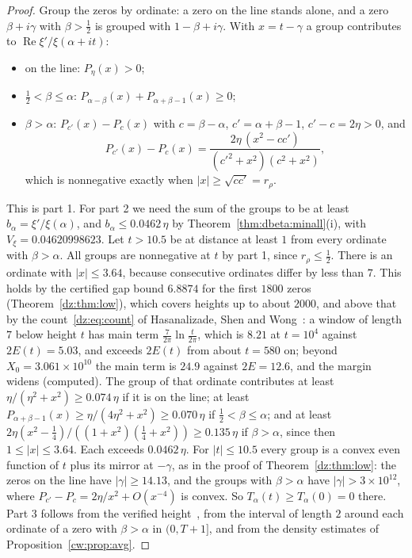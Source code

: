 \begin{proof}
Group the zeros by ordinate: a zero on the line stands alone, and a zero $\beta+i\gamma$ with $\beta>\frac12$ is grouped with $1-\beta+i\gamma$. With $x=t-\gamma$ a group contributes to $\operatorname{Re}\xi'/\xi(\alpha+it)$:
\begin{itemize}
\item on the line: $P_\eta(x)>0$;
\item $\frac12<\beta\le\alpha$: $P_{\alpha-\beta}(x)+P_{\alpha+\beta-1}(x)\ge0$;
\item $\beta>\alpha$: $P_{c'}(x)-P_c(x)$ with $c=\beta-\alpha$, $c'=\alpha+\beta-1$, $c'-c=2\eta>0$, and
\[
P_{c'}(x)-P_c(x)=\frac{2\eta\,(x^2-cc')}{(c'^2+x^2)(c^2+x^2)},
\]
which is nonnegative exactly when $|x|\ge\sqrt{cc'}=r_\rho$.
\end{itemize}
This is part 1. For part 2 we need the sum of the groups to be at least $b_\alpha=\xi'/\xi(\alpha)$, and $b_\alpha\le0.0462\,\eta$ by Theorem~\ref{thm:dbeta:minall}(i), with $V_\xi=0.04620998623$. Let $t>10.5$ be at distance at least $1$ from every ordinate with $\beta>\alpha$. All groups are nonnegative at $t$ by part 1, since $r_\rho\le\frac12$. There is an ordinate with $|x|\le3.64$, because consecutive ordinates differ by less than $7$. This holds by the certified gap bound $6.8874$ for the first $1800$ zeros (Theorem~\ref{dz:thm:low}), which covers heights up to about $2000$, and above that by the count~\eqref{dz:eq:count} of Hasanalizade, Shen and Wong~\cite{HSW22}: a window of length $7$ below height $t$ has main term $\frac7{2\pi}\ln\frac t{2\pi}$, which is $8.21$ at $t=10^4$ against $2E(t)=5.03$, and exceeds $2E(t)$ from about $t=580$ on; beyond $X_0=3.061\times10^{10}$ the main term is $24.9$ against $2E=12.6$, and the margin widens (computed). The group of that ordinate contributes at least $\eta/(\eta^2+x^2)\ge0.074\,\eta$ if it is on the line; at least $P_{\alpha+\beta-1}(x)\ge\eta/(4\eta^2+x^2)\ge0.070\,\eta$ if $\frac12<\beta\le\alpha$; and at least $2\eta(x^2-\frac14)/((1+x^2)(\frac14+x^2))\ge0.135\,\eta$ if $\beta>\alpha$, since then $1\le|x|\le3.64$. Each exceeds $0.0462\,\eta$. For $|t|\le10.5$ every group is a convex even function of $t$ plus its mirror at $-\gamma$, as in the proof of Theorem~\ref{dz:thm:low}: the zeros on the line have $|\gamma|\ge14.13$, and the groups with $\beta>\alpha$ have $|\gamma|>3\times10^{12}$, where $P_{c'}-P_c=2\eta/x^2+O(x^{-4})$ is convex. So $T_\alpha(t)\ge T_\alpha(0)=0$ there. Part 3 follows from the verified height~\cite{PT21}, from the interval of length $2$ around each ordinate of a zero with $\beta>\alpha$ in $(0,T+1]$, and from the density estimates of Proposition~\ref{cw:prop:avg}.
\end{proof}

